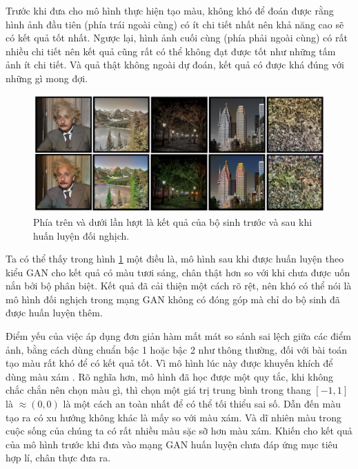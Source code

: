 \documentclass[a4paper, 12pt]{report}
\begin{document}
Trước khi đưa cho mô hình thực hiện tạo màu, không khó để đoán được rằng hình ảnh đầu tiên (phía trái ngoài cùng) có ít chi tiết nhất nên khả năng cao sẽ có kết quả tốt nhất.
Ngược lại, hình ảnh cuối cùng (phía phải ngoài cùng) có rất nhiều chi tiết nên kết quả cũng rất có thể không đạt được tốt như những tấm ảnh ít chi tiết.
Và quả thật không ngoài dự đoán, kết quả có được khá đúng với những gì mong đợi.

\begin{figure}[!h]
\captionsetup{width=0.8\textwidth}
\centering
\includegraphics[width=15cm]{images/4_3.PNG}
\caption{Phía trên và dưới lần lượt là kết quả của bộ sinh trước và sau khi huấn luyện đối nghịch.}
\label{fig:comparesimpleandgan}
\end{figure}


Ta có thể thấy trong hình \ref{fig:comparesimpleandgan} một điều là, mô hình sau khi được huấn luyện theo kiểu GAN cho kết quả có màu tươi sáng, chân thật hơn so với khi chưa được uốn nắn bởi bộ phân biệt.
Kết quả đã cải thiện một cách rõ rệt, nên khó có thể nói là mô hình đối nghịch trong mạng GAN không có đóng góp mà chỉ do bộ sinh đã được huấn luyện thêm.\vspace{5pt}

Điểm yếu của việc áp dụng đơn giản hàm mất mát so sánh sai lệch giữa các điểm ảnh, bằng cách dùng chuẩn bậc 1 hoặc bậc 2 như thông thường, đối với bài toán tạo màu rất khó để có kết quả tốt.
Vì mô hình lúc này được khuyến khích để dùng màu xám \cite{zhangcolorization}.
Rõ nghĩa hơn, mô hình đã học được một quy tắc, khi không chắc chắn nên chọn màu gì, thì chọn một giá trị trung bình trong thang $[-1, 1]$ là $\approx (0, 0)$ là một cách an toàn nhất để có thể tối thiểu sai số.
Dẫn đến màu tạo ra có xu hướng không khác là mấy so với màu xám.
Và dĩ nhiên màu trong cuộc sống của chúng ta có rất nhiều màu sặc sỡ hơn màu xám.
Khiến cho kết quả của mô hình trước khi đưa vào mạng GAN huấn luyện chưa đáp ứng mục tiêu hợp lí, chân thực đưa ra.
\end{document}
